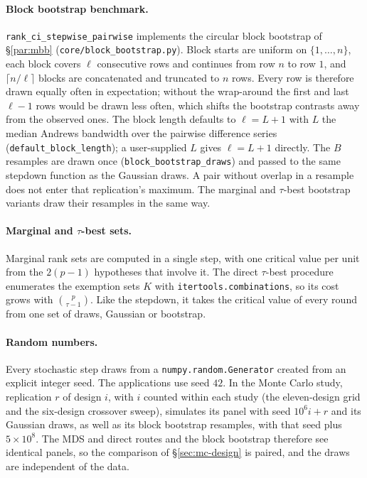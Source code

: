 \begin{appendix}
\paragraph{Block bootstrap benchmark.} \texttt{rank\_ci\_stepwise\_pairwise}
implements the circular block bootstrap of \S\ref{par:mbb}
(\texttt{core/block\_bootstrap.py}). Block starts are uniform on $\{1,\dots,n\}$, each
block covers $\ell$ consecutive rows and continues from row $n$ to row $1$, and
$\lceil n/\ell\rceil$ blocks are concatenated and truncated to $n$ rows. Every row is
therefore drawn equally often in expectation; without the wrap-around the first and
last $\ell-1$ rows would be drawn less often, which shifts the bootstrap contrasts away
from the observed ones. The block length defaults to $\ell=L+1$ with $L$ the median
Andrews bandwidth over the pairwise difference series (\texttt{default\_block\_length});
a user-supplied $L$ gives $\ell=L+1$ directly. The $B$ resamples are drawn once
(\texttt{block\_bootstrap\_draws}) and passed to the same stepdown function as the
Gaussian draws. A pair without overlap in a resample does not enter that replication's
maximum. The marginal and $\tau$-best bootstrap variants draw their resamples in the
same way.

\paragraph{Marginal and $\tau$-best sets.} Marginal rank sets are computed in a single
step, with one critical value per unit from the $2(p-1)$ hypotheses that involve it.
The direct $\tau$-best procedure enumerates the exemption sets $K$ with
\texttt{itertools.combinations}, so its cost grows with $\binom{p}{\tau-1}$. Like the
stepdown, it takes the critical value of every round from one set of draws, Gaussian or
bootstrap.

\paragraph{Random numbers.} Every stochastic step draws from a
\texttt{numpy.random.Generator} created from an explicit integer seed. The
applications use seed $42$. In the Monte Carlo study, replication $r$ of design $i$,
with $i$ counted within each study (the eleven-design grid and the six-design crossover
sweep), simulates its panel with seed $10^6 i+r$ and its Gaussian draws, as well as its block
bootstrap resamples, with that seed plus $5\times10^8$. The MDS and direct routes and
the block bootstrap therefore see identical panels, so the comparison of
\S\ref{sec:mc-design} is paired, and the draws are independent of the data.


\end{appendix}
